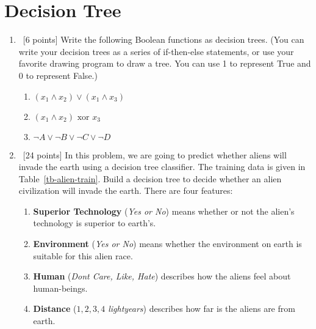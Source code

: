 \section{Decision Tree}
\label{sec:q1}

\begin{enumerate}
    \item~[6 points] Write the following Boolean functions as decision trees. (You can write your decision trees as a series of if-then-else statements, or use your favorite drawing program to draw a tree. You can use 1 to represent True and 0 to represent False.)
        \begin{enumerate}
            \item $(x_1\wedge x_2)\vee (x_1 \wedge x_3)$
            \item $(x_1\wedge x_2) \text{ xor } x_3$
            \item $\neg A \lor \neg B \lor \neg C \lor \neg D$
        \end{enumerate}

    \item~[24 points] In this problem, we are going to predict whether aliens will invade the earth using a decision tree classifier.
    The training data is given in Table~\ref{tb-alien-train}.
    Build a decision tree to decide whether an alien civilization will invade the earth.
    There are four features:
    \begin{enumerate}
        \item\textbf{Superior Technology} (\textit{Yes or No}) means whether or not the alien's technology is superior to earth's.
        \item\textbf{Environment} (\textit{Yes or No}) means whether the environment on earth is suitable for this alien race.
        \item\textbf{Human} (\textit{Dont Care, Like, Hate}) describes how the aliens feel about human-beings.
        \item\textbf{Distance} (\textit{$1,2,3,4$ lightyears}) describes how far is the aliens are from earth.
    \end{enumerate}


\end{enumerate}
